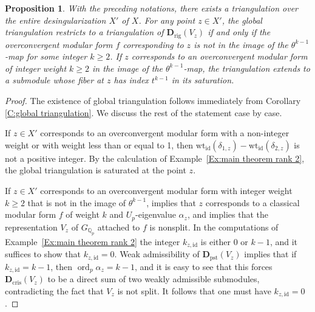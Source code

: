 \documentclass[12pt]{article}
\newtheorem{prop}[theorem]{Proposition}
\theoremstyle{definition}
\numberwithin{equation}{theorem}
\newcommand{\QQ}{\mathbb{Q}}
\newcommand{\bbD}{\mathbf{D}}
\newcommand{\cris}{\mathrm{cris}}
\def\Qp{\QQ_p}
\newcommand{\rig}{\mathrm{rig}}
\DeclareMathOperator{\ord}{ord}
\begin{document}
\begin{prop}
\label{P:eigencurve}
With the preceding notations, there exists a triangulation over the
entire desingularization $X'$ of $X$.  For any point $z \in X'$, the
global triangulation restricts to a triangulation of $\bbD_\rig(V_z)$
if and only if the overconvergent modular form $f$ corresponding to
$z$ is not in the image of the $\theta^{k-1}$-map for some integer $k
\geq 2$.  If $z$ corresponds to an overconvergent modular form of
integer weight $k \geq 2$ in the image of the $\theta^{k-1}$-map, the
triangulation extends to a submodule whose fiber at $z$ has index
$t^{k-1}$ in its saturation.
\end{prop}

\begin{proof}
The existence of global triangulation follows immediately from
Corollary \ref{C:global triangulation}.  We discuss the rest of the
statement case by case.

If $z \in X'$ corresponds to an overconvergent modular form with a
non-integer weight or with weight less than or equal to 1, then
$\mathrm{wt}_\mathrm{id}(\delta_{1,z}) -
\mathrm{wt}_\mathrm{id}(\delta_{2,z})$ is not a positive integer.  By
the calculation of Example~\ref{Ex:main theorem rank 2}, the global
triangulation is saturated at the point $z$.

If $z \in X'$ corresponds to an overconvergent modular form with
integer weight $k \geq 2$ that is not in the image of $\theta^{k-1}$,
\cite[Proposition~5.4.3]{breuil-emerton} implies that $z$ corresponds
to a classical modular form $f$ of weight $k$ and $U_p$-eigenvalue
$\alpha_z$, and \cite[Th\'eor\`eme 1.1.3]{breuil-emerton} implies that
the representation $V_z$ of $G_{\Qp}$ attached to $f$ is nonsplit.  In
the computations of Example~\ref{Ex:main theorem rank 2} the integer
$k_{z,\mathrm{id}}$ is either $0$ or $k-1$, and it suffices to show
that $k_{z,\mathrm{id}}=0$.  Weak admissibility of
$\bbD_\mathrm{pst}(V_z)$ implies that if $k_{z,\mathrm{id}} = k-1$,
then $\ord_p \alpha_z = k-1$, and it is easy to see that this
forces $\bbD_\cris(V_z)$ to be a direct sum of two weakly admissible
submodules, contradicting the fact that $V_z$ is not split.  It
follows that one must have $k_{z,\mathrm{id}}=0$.


\end{proof}
\end{document}
